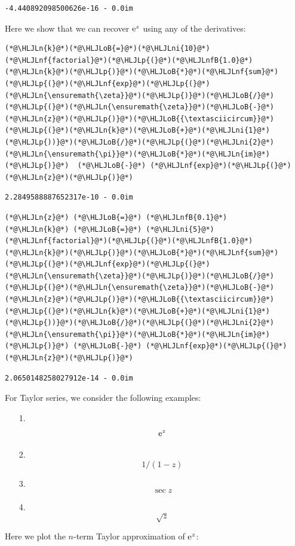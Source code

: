 \documentclass[12pt,a4paper]{article}
\newcommand{\HLJLn}[1]{#1}
\newcommand{\HLJLnf}[1]{\textcolor[RGB]{66,102,213}{#1}}
\newcommand{\HLJLnfB}[1]{\textcolor[RGB]{59,151,46}{#1}}
\newcommand{\HLJLni}[1]{\textcolor[RGB]{59,151,46}{#1}}
\newcommand{\HLJLoB}[1]{\textcolor[RGB]{102,102,102}{\textbf{#1}}}
\newcommand{\HLJLp}[1]{#1}
\def\E{ {\rm e} }
\begin{document}
\begin{lstlisting}
-4.440892098500626e-16 - 0.0im
\end{lstlisting}


Here we show that we can recover $\E^z$ using any of the derivatives:


\begin{lstlisting}
(*@\HLJLn{k}@*)(*@\HLJLoB{=}@*)(*@\HLJLni{10}@*)
(*@\HLJLnf{factorial}@*)(*@\HLJLp{(}@*)(*@\HLJLnfB{1.0}@*)(*@\HLJLn{k}@*)(*@\HLJLp{)}@*)(*@\HLJLoB{*}@*)(*@\HLJLnf{sum}@*)(*@\HLJLp{(}@*)(*@\HLJLnf{exp}@*)(*@\HLJLp{(}@*)(*@\HLJLn{\ensuremath{\zeta}}@*)(*@\HLJLp{)}@*)(*@\HLJLoB{/}@*)(*@\HLJLp{(}@*)(*@\HLJLn{\ensuremath{\zeta}}@*)(*@\HLJLoB{-}@*)(*@\HLJLn{z}@*)(*@\HLJLp{)}@*)(*@\HLJLoB{{\textasciicircum}}@*)(*@\HLJLp{(}@*)(*@\HLJLn{k}@*)(*@\HLJLoB{+}@*)(*@\HLJLni{1}@*)(*@\HLJLp{))}@*)(*@\HLJLoB{/}@*)(*@\HLJLp{(}@*)(*@\HLJLni{2}@*)(*@\HLJLn{\ensuremath{\pi}}@*)(*@\HLJLoB{*}@*)(*@\HLJLn{im}@*)(*@\HLJLp{)}@*)  (*@\HLJLoB{-}@*) (*@\HLJLnf{exp}@*)(*@\HLJLp{(}@*)(*@\HLJLn{z}@*)(*@\HLJLp{)}@*)
\end{lstlisting}

\begin{lstlisting}
2.2849588887652317e-10 - 0.0im
\end{lstlisting}


\begin{lstlisting}
(*@\HLJLn{z}@*) (*@\HLJLoB{=}@*) (*@\HLJLnfB{0.1}@*)
(*@\HLJLn{k}@*) (*@\HLJLoB{=}@*) (*@\HLJLni{5}@*)
(*@\HLJLnf{factorial}@*)(*@\HLJLp{(}@*)(*@\HLJLnfB{1.0}@*)(*@\HLJLn{k}@*)(*@\HLJLp{)}@*)(*@\HLJLoB{*}@*)(*@\HLJLnf{sum}@*)(*@\HLJLp{(}@*)(*@\HLJLnf{exp}@*)(*@\HLJLp{(}@*)(*@\HLJLn{\ensuremath{\zeta}}@*)(*@\HLJLp{)}@*)(*@\HLJLoB{/}@*)(*@\HLJLp{(}@*)(*@\HLJLn{\ensuremath{\zeta}}@*)(*@\HLJLoB{-}@*)(*@\HLJLn{z}@*)(*@\HLJLp{)}@*)(*@\HLJLoB{{\textasciicircum}}@*)(*@\HLJLp{(}@*)(*@\HLJLn{k}@*)(*@\HLJLoB{+}@*)(*@\HLJLni{1}@*)(*@\HLJLp{))}@*)(*@\HLJLoB{/}@*)(*@\HLJLp{(}@*)(*@\HLJLni{2}@*)(*@\HLJLn{\ensuremath{\pi}}@*)(*@\HLJLoB{*}@*)(*@\HLJLn{im}@*)(*@\HLJLp{)}@*) (*@\HLJLoB{-}@*) (*@\HLJLnf{exp}@*)(*@\HLJLp{(}@*)(*@\HLJLn{z}@*)(*@\HLJLp{)}@*)
\end{lstlisting}

\begin{lstlisting}
2.0650148258027912e-14 - 0.0im
\end{lstlisting}


For Taylor series, we consider the following examples:

\begin{itemize}
\item[1. ] \[
\E^z
\]

\item[2. ] \[
1/(1-z)
\]

\item[3. ] \[
\sec z
\]

\item[4. ] \[
\sqrt z
\]
\end{itemize}
Here we plot the $n$-term Taylor approximation of $\E^z$:
\end{document}
